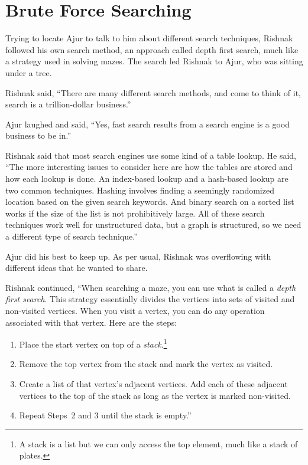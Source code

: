 \chapter{Brute Force Searching}

Trying to locate Ajur to talk to him about different search techniques, Rishnak followed his own search method, an approach called depth first search, much like a strategy used in solving mazes. The search led Rishnak to Ajur, who was sitting under a tree.

Rishnak said, ``There are many different search methods, and come to think of it, search is a trillion-dollar business.''

Ajur laughed and said, ``Yes, fast search results from a search engine is a good business to be in.''

Rishnak said that most search engines use some kind of a table lookup. He said, ``The more interesting issues to consider here are how the tables are stored and how each lookup is done.  An index-based lookup and a hash-based lookup are two common techniques.  Hashing involves finding a seemingly randomized location based on the given search keywords. And binary search on a sorted list works if the size of the list is not prohibitively large. All of these search techniques work well for unstructured data, but a graph is structured, so we need a different type of search technique.''

Ajur did his best to keep up. As per usual, Rishnak was overflowing with different ideas that he wanted to share.

Rishnak continued, ``When searching a maze, you can use what is called a \textit{depth first search}. This strategy essentially divides the vertices into sets of visited and non-visited vertices. When you visit a vertex, you can do any operation associated with that vertex. Here are the steps:

\begin{enumerate}
    \item Place the start vertex on top of a \textit{stack}.\footnote{A stack is a list but we can only access the top element, much like a stack of plates.}
     \item Remove the top vertex from the stack and mark the vertex as visited.
     \item Create a list of that vertex's adjacent vertices. Add each of these adjacent vertices to the top of the stack as long as the vertex is marked non-visited.
     \item Repeat Steps~2 and 3 until the stack is empty.''
\end{enumerate}

